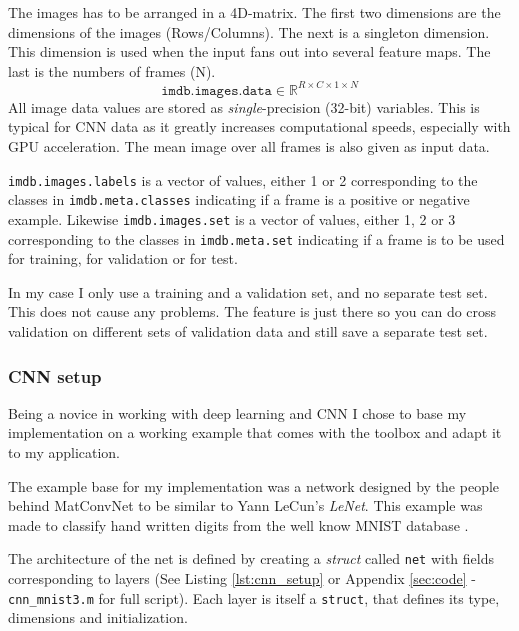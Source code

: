 \documentclass[Main]{subfiles}
\begin{document}
			The images has to be arranged in a 4D-matrix.
			The first two dimensions are the dimensions of the images (Rows/Columns).
			The next is a singleton dimension.
			This dimension is used when the input fans out into several feature maps.
			The last is the numbers of frames (N).
			\begin{equation}
				\texttt{imdb.images.data} \in \mathbb{R}^{R\times C\times1\times N} 
			\end{equation}
			All image data values are stored as \emph{single}-precision (32-bit) variables.
			This is typical for CNN data as it greatly increases computational speeds, especially with GPU acceleration.
			The mean image over all frames is also given as input data.

			\texttt{imdb.images.labels} is a vector of values, either 1 or 2 corresponding to the classes in \texttt{imdb.meta.classes} indicating if a frame is a positive or negative example.
			Likewise \texttt{imdb.images.set} is a vector of values, either 1, 2  or 3 corresponding to the classes in \texttt{imdb.meta.set} indicating if a frame is to be used for training, for validation or for test.

			In my case I only use a training and a validation set, and no separate test set.
			This does not cause any problems.
			The feature is just there so you can do cross validation on different sets of validation data and still save a separate test set.


		\subsubsection{CNN setup} %
			\label{ssub:cnn_setup}
			Being a novice in working with deep learning and CNN I chose to base my implementation on a working example that comes with the toolbox and adapt it to my application.

			The example base for my implementation was a network designed by the people behind MatConvNet to be similar to Yann LeCun's \emph{LeNet}.
			This example was made to classify hand written digits from the well know MNIST database \cite{mnistlecun}.

			The architecture of the net is defined by creating a \emph{struct} called \texttt{net} with fields corresponding to layers
			(See Listing \ref{lst:cnn_setup} or Appendix \ref{sec:code} - \texttt{cnn\_mnist3.m} for full script).
			Each layer is itself a \texttt{struct}, that defines its type, dimensions and initialization.
\end{document}
